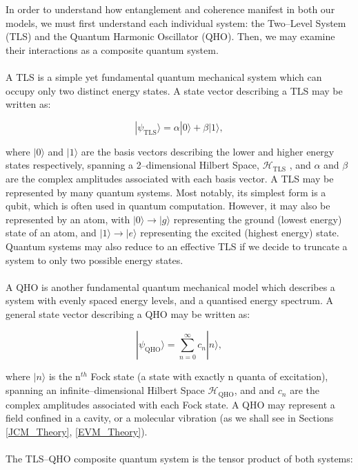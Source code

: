 \documentclass[12pt]{article}
\begin{document}
In order to understand how entanglement and coherence manifest in both our models, we must first understand each individual system: the Two--Level System (TLS) and the Quantum Harmonic Oscillator (QHO). Then, we may examine their interactions as a composite quantum system.\\
\\
A TLS is a simple yet fundamental quantum mechanical system which can occupy only two distinct energy states. A state vector describing a TLS may be written as:

\begin{equation}
    |\psi_{\scriptscriptstyle \text{TLS}}\rangle = \alpha|0\rangle + \beta|1\rangle,
\end{equation}

where $|0\rangle$ and $|1\rangle$ are the basis vectors describing the lower and higher energy states respectively, spanning a 2--dimensional Hilbert Space, $\mathcal{H}_{\scriptscriptstyle \text{TLS}}$ , and $\alpha$ and $\beta$ are the complex amplitudes associated with each basis vector. A TLS may be represented by many quantum systems. Most notably, its simplest form is a qubit, which is often used in quantum computation. However, it may also be represented by an atom, with $|0\rangle \rightarrow |g\rangle$ representing the ground (lowest energy) state of an atom, and $|1\rangle \rightarrow |e\rangle$ representing the excited (highest energy) state. Quantum systems may also reduce to an effective TLS if we decide to truncate a system to only two possible energy states. \\
\\
A QHO is another fundamental quantum mechanical model which describes a system with evenly spaced energy levels, and a quantised energy spectrum. A general state vector describing a QHO may be written as:

\begin{equation}
|\psi_{\scriptscriptstyle \text{QHO}}\rangle = \sum_{n=0}^\infty c_n |n\rangle,
\end{equation}

where $|n\rangle$ is the n$^{th}$ Fock state (a state with exactly n quanta of excitation), spanning an infinite--dimensional Hilbert Space $\mathcal{H}_{\scriptscriptstyle \text{QHO}}$, and and $c_n$ are the complex amplitudes associated with each Fock state. A QHO may represent a field confined in a cavity, or a molecular vibration (as we shall see in Sections \ref{JCM_Theory}, \ref{EVM_Theory}).\\
\\
The TLS--QHO composite quantum system is the tensor product of both systems:
\end{document}
